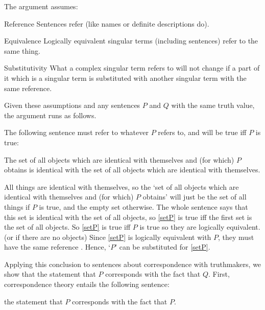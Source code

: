 The argument assumes:
\parencite[753]{Davidson_1969}

	\begin{principle}{Reference}\label{srefer}
	Sentences refer (like names or definite descriptions do).
	\end{principle}

	\begin{principle}{Equivalence}\label{sameref}
	Logically equivalent singular terms (including sentences) refer to the same thing.
	\end{principle}

	\begin{principle}{Substitutivity}\label{constref}
	What a complex singular term refers to will not change if a part of it which is a singular term is substituted with another singular term with the same reference.
	\end{principle}

Given these assumptions and any sentences $P$ and $Q$ with the same truth value, the argument runs as follows.

The following sentence must refer to whatever $P$ refers to, and will be true iff $P$ is true:

	\begin{example}\label{setP}
	The set of all objects which are identical with themselves and (for which) $P$ obtains is identical with the set of all objects which are identical with themselves.
	\end{example}

All things are identical with themselves, so the `set of all objects which are identical with themselves and (for which) $P$ obtains' will just be the set of all things if $P$ is true, and the empty set otherwise.
The whole sentence says that this set is identical with the set of all objects, so \ref{setP} is true iff the first set is the set of all objects.
So \ref{setP} is true iff $P$ is true so they are logically equivalent. (or if there are no objects)
Since \ref{setP} is logically equivalent with $P$, they must have the same reference .
Hence, `$P$' can be substituted for \ref{setP}.

Applying this conclusion to sentences about correspondence with truthmakers, we show that the statement that $P$ corresponds with the fact that $Q$.
First, correspondence theory entails the following sentence:

	\begin{example}\label{stateP}
	the statement that $P$ corresponds with the fact that $P$.
	\end{example}

